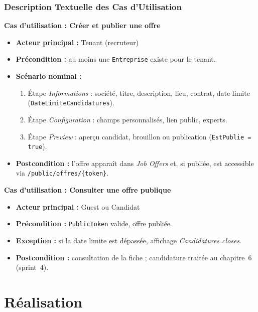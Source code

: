 \subsubsection{Description Textuelle des Cas d'Utilisation}

\textbf{Cas d'utilisation : Créer et publier une offre}

\begin{itemize}
    \item \textbf{Acteur principal :} Tenant (recruteur)
    \item \textbf{Précondition :} au moins une \texttt{Entreprise} existe pour le tenant.
    \item \textbf{Scénario nominal :}
    \begin{enumerate}
        \item Étape \textit{Informations} : société, titre, description, lieu, contrat,
        date limite (\texttt{DateLimiteCandidatures}).
        \item Étape \textit{Configuration} : champs personnalisés, lien public, experts.
        \item Étape \textit{Preview} : aperçu candidat, brouillon ou publication
        (\texttt{EstPublie = true}).
    \end{enumerate}
    \item \textbf{Postcondition :} l'offre apparaît dans \textit{Job Offers} et, si
    publiée, est accessible via \texttt{/public/offres/\{token\}}.
\end{itemize}

\textbf{Cas d'utilisation : Consulter une offre publique}

\begin{itemize}
    \item \textbf{Acteur principal :} Guest ou Candidat
    \item \textbf{Précondition :} \texttt{PublicToken} valide, offre publiée.
    \item \textbf{Exception :} si la date limite est dépassée, affichage
    \textit{Candidatures closes}.
    \item \textbf{Postcondition :} consultation de la fiche ; candidature traitée au
    chapitre~6 (sprint~4).
\end{itemize}

\section{Réalisation}

